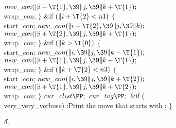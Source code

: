 ${}\\{new\_con}(\|i-\T{1},\39\|j,\39\|k+\T{1});{}$\6
\\{wrap\_con};\6
\4${}\}{}$\2\6
\&{if} ${}(\|i+\T{2}<\\{n1}){}$\5
${}\{{}$\1\6
\\{start\_con};\6
${}\\{new\_con}(\|i+\T{2},\39\|j,\39\|k);{}$\6
${}\\{new\_con}(\|i+\T{2},\39\|j,\39\|k+\T{1});{}$\6
\\{wrap\_con};\6
\4${}\}{}$\2\6
\&{if} ${}(\|k>\T{0}){}$\5
${}\{{}$\1\6
\\{start\_con};\6
${}\\{new\_con}(\|i,\39\|j,\39\|k-\T{1});{}$\6
${}\\{new\_con}(\|i+\T{1},\39\|j,\39\|k-\T{1});{}$\6
\\{wrap\_con};\6
\4${}\}{}$\2\6
\&{if} ${}(\|k+\T{2}<\\{n3}){}$\5
${}\{{}$\1\6
\\{start\_con};\6
${}\\{new\_con}(\|i,\39\|j,\39\|k+\T{2});{}$\6
${}\\{new\_con}(\|i+\T{1},\39\|j,\39\|k+\T{2});{}$\6
\\{wrap\_con};\6
\4${}\}{}$\2\6
${}\\{cur\_clist}\PP;{}$\6
${}\\{cur\_tag}\PP;{}$\6
\&{if} (\\{very\_very\_verbose})\1\5
:Print the move that starts with \X;\2\6
\4${}\}{}$\2\2\2\par
\U4.\fi

